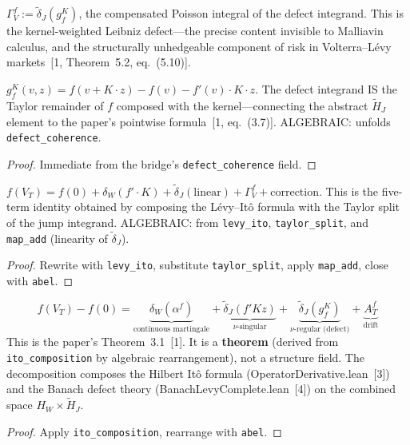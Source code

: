 \begin{defn}\label{def:kernel_weighted_defect}
\leanok
{}
$\Gamma_V^f := \tilde{\delta}_J(g_f^K)$, the compensated Poisson integral of the defect integrand. This is the kernel-weighted Leibniz defect---the precise content invisible to Malliavin calculus, and the structurally unhedgeable component of risk in Volterra--L\'evy markets~[1, Theorem~5.2, eq.~(5.10)].
\end{defn}

\begin{theorem}\label{thm:defect_is_taylor_remainder}
\leanok
{}
$g_f^K(v,z) = f(v + K \cdot z) - f(v) - f'(v) \cdot K \cdot z$. The defect integrand IS the Taylor remainder of $f$ composed with the kernel---connecting the abstract $\tilde{H}_J$ element to the paper's pointwise formula~[1, eq.~(3.7)]. ALGEBRAIC: unfolds \texttt{defect\_coherence}.
\end{theorem}
\begin{proof}\leanok Immediate from the bridge's \texttt{defect\_coherence} field.\end{proof}

\begin{lemma}[It\^o composition]\label{lem:ito_composition}
\leanok
{}
$f(V_T) = f(0) + \delta_W(f' \cdot K) + \tilde{\delta}_J(\text{linear}) + \Gamma_V^f + \text{correction}$. This is the five-term identity obtained by composing the L\'evy--It\^o formula with the Taylor split of the jump integrand. ALGEBRAIC: from \texttt{levy\_ito}, \texttt{taylor\_split}, and \texttt{map\_add} (linearity of $\tilde{\delta}_J$).
\end{lemma}
\begin{proof}\leanok Rewrite with \texttt{levy\_ito}, substitute \texttt{taylor\_split}, apply \texttt{map\_add}, close with \texttt{abel}.\end{proof}

\begin{theorem}\label{thm:volterra_levy_ito_decomposition}
\leanok
{}
\[
f(V_T) - f(0) = \underbrace{\delta_W(\alpha^f)}_{\text{continuous martingale}} + \underbrace{\tilde{\delta}_J(f' K z)}_{\nu\text{-singular}} + \underbrace{\tilde{\delta}_J(g_f^K)}_{\nu\text{-regular (defect)}} + \underbrace{A_T^f}_{\text{drift}}
\]
This is the paper's Theorem~3.1~[1]. It is a \textbf{theorem} (derived from \texttt{ito\_composition} by algebraic rearrangement), not a structure field. The decomposition composes the Hilbert It\^o formula (OperatorDerivative.lean~[3]) and the Banach defect theory (BanachLevyComplete.lean~[4]) on the combined space $H_W \times \tilde{H}_J$.
\end{theorem}
\begin{proof}\leanok Apply \texttt{ito\_composition}, rearrange with \texttt{abel}.\end{proof}

